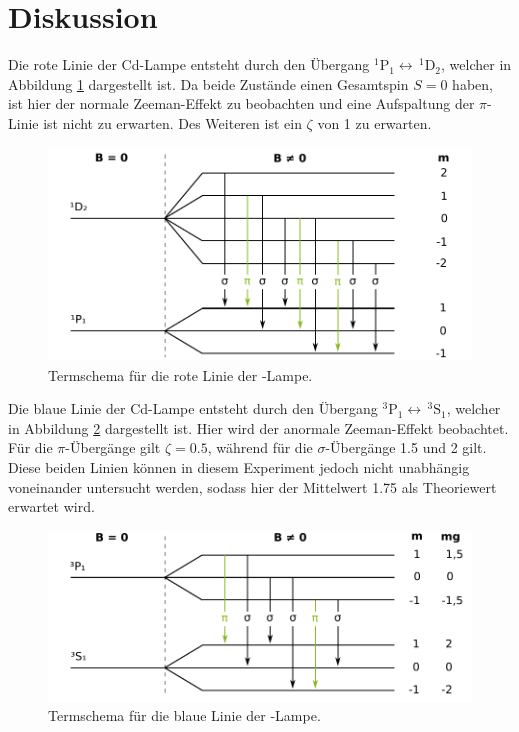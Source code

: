 \section{Diskussion}
\label{sec:Diskussion}

Die rote Linie der Cd-Lampe entsteht durch den Übergang
$^1\mathrm{P}_1 \leftrightarrow\, ^1\mathrm{D}_2$,
welcher in Abbildung \ref{fig:termschema-rot} dargestellt ist.
Da beide Zustände einen Gesamtspin $S = \num{0}$ haben, ist hier
der normale Zeeman-Effekt zu beobachten und eine Aufspaltung der
$\pi$-Linie ist nicht zu erwarten.
Des Weiteren ist ein $\zeta$ von \num{1} zu erwarten.
\begin{figure}
	\centering
	\includegraphics{images/termschema-rot.pdf}
	\caption{Termschema für die rote Linie der -Lampe.}
	\label{fig:termschema-rot}
\end{figure}

Die blaue Linie der Cd-Lampe entsteht durch den Übergang
$^3\mathrm{P}_1 \leftrightarrow\, ^3\mathrm{S}_1$,
welcher in Abbildung \ref{fig:termschema-blau} dargestellt
ist. Hier wird der anormale Zeeman-Effekt beobachtet.
Für die $\pi$-Übergänge gilt $\zeta = \num{0.5}$, während
für die $\sigma$-Übergänge \num{1.5} und \num{2} gilt.
Diese beiden Linien können in diesem Experiment jedoch nicht
unabhängig voneinander untersucht werden, sodass hier der
Mittelwert \num{1.75} als Theoriewert erwartet wird.
\begin{figure}
  \centering
  \includegraphics{images/termschema-blau.pdf}
  \caption{Termschema für die blaue Linie der -Lampe.}
  \label{fig:termschema-blau}
\end{figure}

